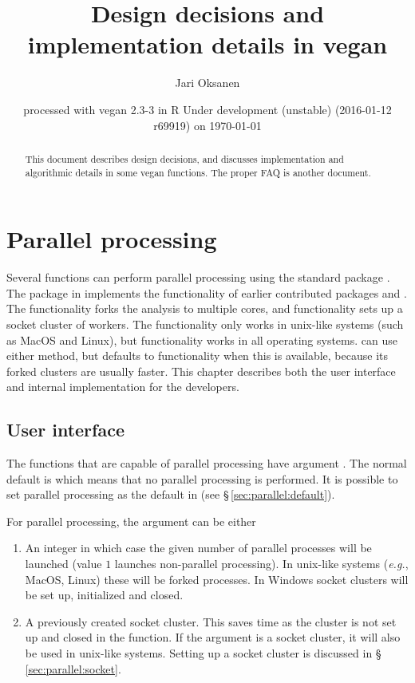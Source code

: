\documentclass[a4paper,10pt,twocolumn]{article}
\author{Jari Oksanen}
\title{Design decisions and implementation details in vegan}
\date{\footnotesize{
  processed with vegan
2.3-3
in R Under development (unstable) (2016-01-12 r69919) on \today}}
\begin{document}




\maketitle

\begin{abstract}
  This document describes design decisions, and discusses implementation
and algorithmic details in some vegan functions. The proper FAQ is
another document.
\end{abstract}

\tableofcontents

\section{Parallel processing}

Several  functions can perform parallel processing using
the standard \R{} package . 
The  package in \R{} implements
the functionality of earlier contributed packages  and
.  The  functionality forks the analysis to
multiple cores, and  functionality sets up a socket cluster
of workers.  The  functionality only works in unix-like
systems (such as MacOS and Linux), but  functionality works
in all operating systems.   can use either method, but
defaults to  functionality when this is available,
because its forked clusters are usually faster.  This chapter
describes both the user interface and internal implementation for the
developers.

\subsection{User interface}
\label{sec:parallel:ui}

The functions that are capable of parallel processing have argument
.  The normal default is  which
means that no parallel processing is performed.  It is possible to set
parallel processing as the default in  (see
\S\,\ref{sec:parallel:default}). 

For parallel processing, the  argument can be either

\begin{enumerate}
\item An integer in which case the given number of parallel processes
  will be launched (value $1$ launches non-parallel processing). In
  unix-like systems (\emph{e.g.}, MacOS, Linux) these will be forked
   processes. In Windows socket clusters will be set up,
  initialized and closed.
\item A previously created socket cluster. This saves time as the
  cluster is not set up and closed in the function.  If the argument is a
  socket cluster, it will also be used in unix-like systems. Setting
  up a socket cluster is discussed in \S\,\ref{sec:parallel:socket}.
\end{enumerate}
\end{document}
